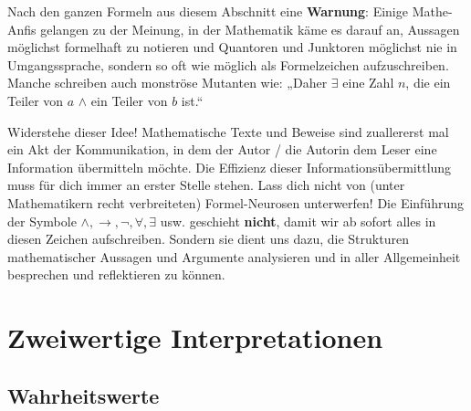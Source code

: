 \begin{bem}
    Nach den ganzen Formeln aus diesem Abschnitt eine \textbf{Warnung}: Einige Mathe-Anfis gelangen zu der Meinung, in der Mathematik käme es darauf an, Aussagen möglichst formelhaft zu notieren und Quantoren und Junktoren möglichst nie in Umgangssprache, sondern so oft wie möglich als Formelzeichen aufzuschreiben. Manche schreiben auch monströse Mutanten wie: „Daher $\exists$ eine Zahl $n$, die ein Teiler von $a$ $\land$ ein Teiler von $b$ ist.“
    
    Widerstehe dieser Idee! Mathematische Texte und Beweise sind zuallererst mal ein Akt der Kommunikation, in dem der Autor / die Autorin dem Leser eine Information übermitteln möchte. Die Effizienz dieser Informationsübermittlung muss für dich immer an erster Stelle stehen. Lass dich nicht von (unter Mathematikern recht verbreiteten) Formel-Neurosen unterwerfen! Die Einführung der Symbole $\land,\to,\neg,\forall,\exists$ usw. geschieht \textbf{nicht}, damit wir ab sofort alles in diesen Zeichen aufschreiben. Sondern sie dient uns dazu, die Strukturen mathematischer Aussagen und Argumente analysieren und in aller Allgemeinheit besprechen und reflektieren zu können.
\end{bem}





\section{Zweiwertige Interpretationen}


\subsection*{Wahrheitswerte}


